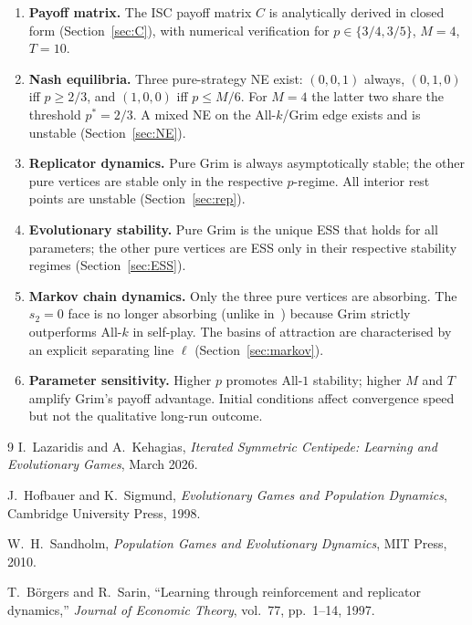 \documentclass[12pt,a4paper]{article}
\begin{document}
\begin{enumerate}
  \item \textbf{Payoff matrix.} The ISC payoff matrix $C$ is analytically
        derived in closed form (Section~\ref{sec:C}), with numerical verification
        for $p\in\{3/4,3/5\}$, $M=4$, $T=10$.

  \item \textbf{Nash equilibria.} Three pure-strategy NE exist: $(0,0,1)$ always,
        $(0,1,0)$ iff $p\geq 2/3$, and $(1,0,0)$ iff $p\leq M/6$. For $M=4$ the
        latter two share the threshold $p^*=2/3$. A mixed NE on the
        All-$k$/Grim edge exists and is unstable (Section~\ref{sec:NE}).

  \item \textbf{Replicator dynamics.} Pure Grim is always asymptotically stable;
        the other pure vertices are stable only in the respective $p$-regime.
        All interior rest points are unstable (Section~\ref{sec:rep}).

  \item \textbf{Evolutionary stability.} Pure Grim is the unique ESS that holds
        for all parameters; the other pure vertices are ESS only in their
        respective stability regimes (Section~\ref{sec:ESS}).

  \item \textbf{Markov chain dynamics.} Only the three pure vertices are
        absorbing. The $s_2=0$ face is no longer absorbing (unlike in~\cite{LK2026})
        because Grim strictly outperforms All-$k$ in self-play. The basins of
        attraction are characterised by an explicit separating line $\ell$
        (Section~\ref{sec:markov}).

  \item \textbf{Parameter sensitivity.} Higher $p$ promotes All-$1$ stability;
        higher $M$ and $T$ amplify Grim's payoff advantage. Initial conditions
        affect convergence speed but not the qualitative long-run outcome.
\end{enumerate}

\begin{thebibliography}{9}
  I.~Lazaridis and A.~Kehagias,
  \textit{Iterated Symmetric Centipede: Learning and Evolutionary Games},
  March 2026.

  J.~Hofbauer and K.~Sigmund,
  \textit{Evolutionary Games and Population Dynamics},
  Cambridge University Press, 1998.

  W.~H.~Sandholm,
  \textit{Population Games and Evolutionary Dynamics},
  MIT Press, 2010.

  T.~B\"{o}rgers and R.~Sarin,
  ``Learning through reinforcement and replicator dynamics,''
  \textit{Journal of Economic Theory}, vol.~77, pp.~1--14, 1997.
\end{thebibliography}
\end{document}
